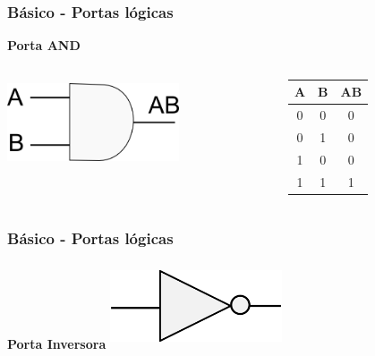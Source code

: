 \documentclass{beamer}
\begin{document}
\begin{frame}
  \frametitle{Básico - Portas lógicas}
\begin{center}
   \textbf{\huge{Porta AND}}
   \begin{columns}[c]
   \begin{column}{5cm}
    \includegraphics[height = 1in, width = 2in]{and.png}
   \end{column}\pause
   \begin{column}{5cm}
    \begin{tabular}{|c|c|c|}
     \hline
     A & B & AB \\
     \hline	
     0 & 0 & 0 \\
     0 & 1 & 0 \\
     1 & 0 & 0 \\
     1 & 1 & 1 \\ 
     \hline
    \end{tabular}
   \end{column}

  \end{columns}
\end{center}
\end{frame}

\begin{frame}
  \frametitle{Básico - Portas lógicas}
  \begin{center}
    \textbf{\huge{Porta Inversora}}
    \includegraphics[height = 1in, width = 2in]{inversora.png}
  \end{center}
\end{frame}
\end{document}
